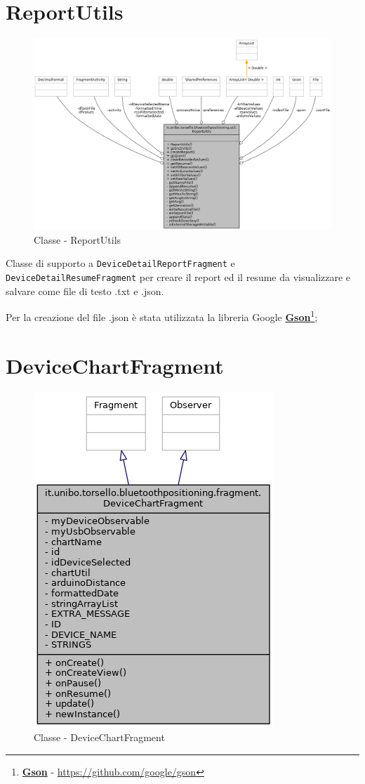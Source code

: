 \section{ReportUtils}
\begin{figure}[ph]
	\centering
	\includegraphics[width=1.2\linewidth]{img/uml/class/classit_1_1unibo_1_1torsello_1_1bluetoothpositioning_1_1util_1_1ReportUtils__coll__graph.png}
	\caption{Classe - ReportUtils}
\end{figure}

Classe di supporto a \texttt{DeviceDetailReportFragment} e \texttt{DeviceDetailResumeFragment} per creare il report ed il resume da visualizzare e salvare come file di testo .txt e .json.

Per la creazione del file .json è stata utilizzata la libreria Google \href{https://github.com/google/gson}{\textbf{Gson}}\footnote{\href{https://github.com/google/gson}{\textbf{Gson}} - \url{https://github.com/google/gson}};

\newpage
\section{DeviceChartFragment}
\begin{figure}[ph]
	\centering
	\includegraphics[width=0.5\linewidth]{img/uml/class/classit_1_1unibo_1_1torsello_1_1bluetoothpositioning_1_1fragment_1_1DeviceChartFragment__inherit__graph.png}
	\caption{Classe - DeviceChartFragment}
\end{figure}

